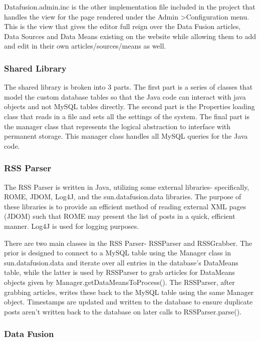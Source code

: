 \documentclass[11pt]{article} %
\begin{document}
Datafusion.admin.inc is the other implementation file included in the project that handles the view for the page rendered under the Admin \textgreater Configuration menu. This is the view that gives the editor full reign over the Data Fusion articles, Data Sources and Data Means existing on the website while allowing them to add and edit in their own articles/sources/means as well.

\subsubsection{Shared Library}

The shared library is broken into 3 parts. The first part is a series of classes that model the custom database tables so that the Java code can interact with java objects and not MySQL tables directly. The second part is the Properties loading class that reads in a file and sets all the settings of the system. The final part is the manager class that represents the logical abstraction to interface with permanent storage. This manager class handles all MySQL queries for the Java code. 

\subsubsection{RSS Parser}

The RSS Parser is written in Java, utilizing some external libraries- specifically, ROME, JDOM, Log4J, and the sun.datafusion.data libraries. The purpose of these libraries is to provide an efficient method of reading external XML pages (JDOM) such that ROME may present the list of posts in a quick, efficient manner. Log4J is used for logging purposes.

There are two main classes in the RSS Parser- RSSParser and RSSGrabber. The prior is designed to connect to a MySQL table using the Manager class in sun.datafusion.data and iterate over all entries in the database’s DataMeans table, while the latter is used by RSSParser to grab articles for DataMeans objects given by Manager.getDataMeansToProcess(). The RSSParser, after grabbing articles, writes these back to the MySQL table using the same Manager object. Timestamps are updated and written to the database to ensure duplicate posts aren’t written back to the database on later calls to RSSParser.parse().

\subsubsection{Data Fusion}
\end{document}
